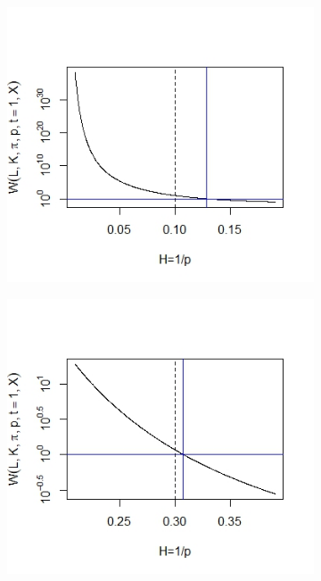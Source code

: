 \documentclass{article}
\begin{document}
\begin{figure}[htbp]
    \centering
    
    \begin{subfigure}{0.48\textwidth}
        \includegraphics[width=\linewidth]{wagainstp_H01.jpeg}
    \end{subfigure}
    \hfill
    \begin{subfigure}{0.48\textwidth}
        \includegraphics[width=\linewidth]{wagainstp_H03.jpeg}

\end{subfigure}
\end{figure}
\end{document}
